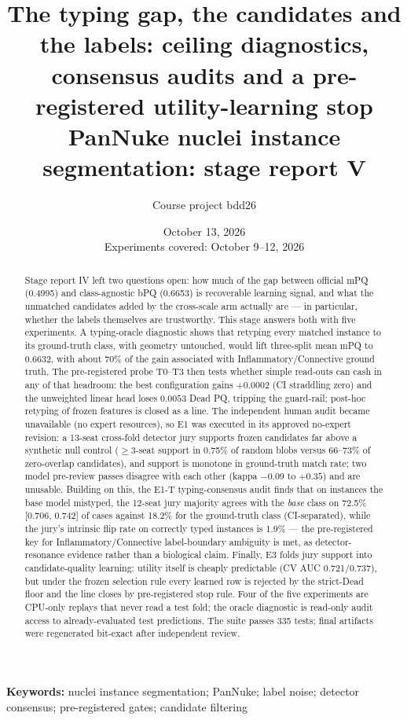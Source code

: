\documentclass[11pt,a4paper]{article}
\title{\bfseries The typing gap, the candidates and the labels: ceiling diagnostics,\\consensus audits and a pre-registered utility-learning stop\\[7pt]
\large PanNuke nuclei instance segmentation: stage report V}
\author{Course project bdd26}
\date{October 13, 2026\\\small Experiments covered: October 9--12, 2026}
\begin{document}
\maketitle

\begin{abstract}
Stage report IV left two questions open: how much of the gap between official mPQ (0.4995) and class-agnostic bPQ (0.6653) is recoverable learning signal, and what the unmatched candidates added by the cross-scale arm actually are --- in particular, whether the labels themselves are trustworthy. This stage answers both with five experiments. A typing-oracle diagnostic shows that retyping every matched instance to its ground-truth class, with geometry untouched, would lift three-split mean mPQ to 0.6632, with about 70\% of the gain associated with Inflammatory/Connective ground truth. The pre-registered probe T0--T3 then tests whether simple read-outs can cash in any of that headroom: the best configuration gains $+0.0002$ (CI straddling zero) and the unweighted linear head loses $0.0053$ Dead PQ, tripping the guard-rail; post-hoc retyping of frozen features is closed as a line. The independent human audit became unavailable (no expert resources), so E1 was executed in its approved no-expert revision: a 13-seat cross-fold detector jury supports frozen candidates far above a synthetic null control ($\geq$3-seat support in 0.75\% of random blobs versus 66--73\% of zero-overlap candidates), and support is monotone in ground-truth match rate; two model pre-review passes disagree with each other (kappa $-0.09$ to $+0.35$) and are unusable. Building on this, the E1-T typing-consensus audit finds that on instances the base model mistyped, the 12-seat jury majority agrees with the \emph{base} class on 72.5\% [0.706, 0.742] of cases against 18.2\% for the ground-truth class (CI-separated), while the jury's intrinsic flip rate on correctly typed instances is 1.9\% --- the pre-registered key for Inflammatory/Connective label-boundary ambiguity is met, as detector-resonance evidence rather than a biological claim. Finally, E3 folds jury support into candidate-quality learning: utility itself is cheaply predictable (CV AUC 0.721/0.737), but under the frozen selection rule every learned row is rejected by the strict-Dead floor and the line closes by pre-registered stop rule. Four of the five experiments are CPU-only replays that never read a test fold; the oracle diagnostic is read-only audit access to already-evaluated test predictions. The suite passes 335 tests; final artifacts were regenerated bit-exact after independent review.
\end{abstract}
\noindent\textbf{Keywords:} nuclei instance segmentation; PanNuke; label noise; detector consensus; pre-registered gates; candidate filtering
\end{document}
